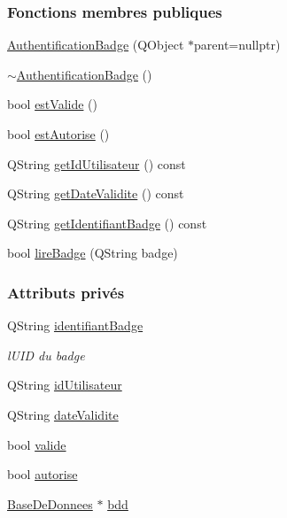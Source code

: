 \subsubsection*{Fonctions membres publiques}
\begin{DoxyCompactItemize}
\item 
\hyperlink{class_authentification_badge_a6c27fe0dc2a4a20fec1e75da5b400146}{Authentification\+Badge} (Q\+Object $\ast$parent=nullptr)
\item 
\hyperlink{class_authentification_badge_a636b585e4c7f37ae77bf2fd66c0b01e1}{$\sim$\+Authentification\+Badge} ()
\item 
bool \hyperlink{class_authentification_badge_af320bf9cdbb285c48cd323e0ec3ef529}{est\+Valide} ()
\item 
bool \hyperlink{class_authentification_badge_aceb9c5a09dddbff73cd02973913c79c1}{est\+Autorise} ()
\item 
Q\+String \hyperlink{class_authentification_badge_ae8c755b184c20626d4362d5e4739dfe1}{get\+Id\+Utilisateur} () const
\item 
Q\+String \hyperlink{class_authentification_badge_a76f7b9a424aeec947813c6858ff945a3}{get\+Date\+Validite} () const
\item 
Q\+String \hyperlink{class_authentification_badge_a4bb0edf5a4483d9125bc53b1a7e24b7b}{get\+Identifiant\+Badge} () const
\item 
bool \hyperlink{class_authentification_badge_a77488a375465873bfe6ab62f53abea6d}{lire\+Badge} (Q\+String badge)
\end{DoxyCompactItemize}
\subsubsection*{Attributs privés}
\begin{DoxyCompactItemize}
\item 
Q\+String \hyperlink{class_authentification_badge_a7120366168cbe21efd991a978922eb20}{identifiant\+Badge}
\begin{DoxyCompactList}\small\item\em l\textquotesingle{}U\+ID du badge \end{DoxyCompactList}\item 
Q\+String \hyperlink{class_authentification_badge_ab26f8f696e807cbffd2c50cbad465b89}{id\+Utilisateur}
\item 
Q\+String \hyperlink{class_authentification_badge_a3ff41c56490c3cfd0322949be2338605}{date\+Validite}
\item 
bool \hyperlink{class_authentification_badge_a9d0df9da3663b065a3a6a7a1f37a0a69}{valide}
\item 
bool \hyperlink{class_authentification_badge_a79ea3c5d0df4f8f04863d3e218d8a6f0}{autorise}
\item 
\hyperlink{class_base_de_donnees}{Base\+De\+Donnees} $\ast$ \hyperlink{class_authentification_badge_a0b9c724c5bc25bf1f87443d7e6833398}{bdd}
\end{DoxyCompactItemize}


